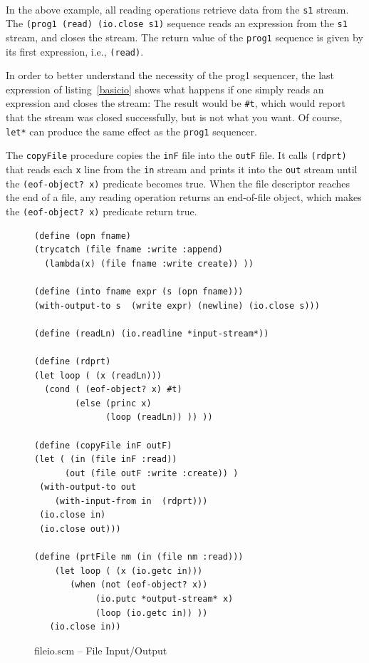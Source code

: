 \documentclass[a4paper,12pt]{book}
\newenvironment{fmpage}[1]
           {\begin{lrbox}{\fmbox}\begin{minipage}{#1}}
           {\end{minipage}\end{lrbox}\fbox{\usebox{\fmbox}}}
\begin{document}
\verb||\\
In the above example, all reading
operations retrieve data from the \verb|s1| stream.
The {\small \verb|(prog1 (read) (io.close s1)|}
sequence reads an expression from the \verb|s1|
stream, and closes the stream. The return
value of the \verb|prog1| sequence is given by its
first expression, i.e., \verb|(read)|.

In order to better understand the
necessity of the prog1 sequencer,
the last expression of listing~\ref{basicio}
shows what happens if one simply reads
an expression and closes the stream:
The result would be \verb|#t|, which
would report that the stream was closed 
successfully, but is not what you want.
Of course, \verb|let*| can produce
the same effect as the \verb|prog1| sequencer.

The \verb|copyFile| procedure copies
the \verb|inF| file into the \verb|outF| file.
It calls \verb|(rdprt)| that reads
each \verb|x| line from the \verb|in| stream
and prints it into the \verb|out| stream
until the \verb|(eof-object? x)| predicate
becomes true. When the file descriptor
reaches the end of a file, any reading
operation returns an end-of-file object,
which makes the \verb|(eof-object? x)| predicate
return true. 
\begin{figure}[!h]
\begin{fmpage}{0.95\textwidth}
\begin{verbatim}
(define (opn fname)
(trycatch (file fname :write :append)
  (lambda(x) (file fname :write create)) ))

(define (into fname expr (s (opn fname)))
(with-output-to s  (write expr) (newline) (io.close s)))

(define (readLn) (io.readline *input-stream*))

(define (rdprt)
(let loop ( (x (readLn)))
  (cond ( (eof-object? x) #t)
        (else (princ x)
              (loop (readLn)) )) ))

(define (copyFile inF outF)
(let ( (in (file inF :read))
      (out (file outF :write :create)) )
 (with-output-to out
    (with-input-from in  (rdprt)))
 (io.close in)
 (io.close out)))

(define (prtFile nm (in (file nm :read)))
    (let loop ( (x (io.getc in)))
       (when (not (eof-object? x))
            (io.putc *output-stream* x)
            (loop (io.getc in)) ))
   (io.close in))
\end{verbatim}
\end{fmpage}
\caption{fileio.scm -- File Input/Output}
\label{cpyFile}
\end{figure}
\end{document}
